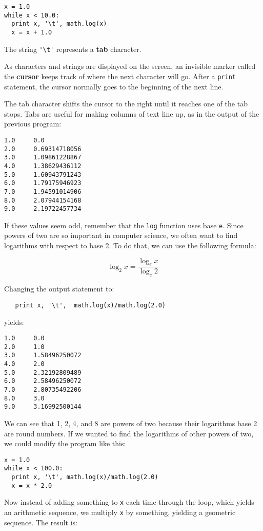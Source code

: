 \beforeverb
\begin{verbatim}
x = 1.0
while x < 10.0:
  print x, '\t', math.log(x)
  x = x + 1.0
\end{verbatim}
\afterverb
%
The string 
\verb+'\t'+ represents a {\bf tab}
character.

As characters and strings are displayed on the screen,
an invisible marker called the {\bf cursor} keeps track of
where the next character will go.  After a {\tt print} statement, the
cursor normally goes to the beginning of the next line.

The tab character shifts the cursor to the right until it
reaches one of the tab stops.  Tabs are useful for making columns of
text line up, as in the output of the previous program:

\beforeverb
\begin{verbatim}
1.0     0.0
2.0     0.69314718056
3.0     1.09861228867
4.0     1.38629436112
5.0     1.60943791243
6.0     1.79175946923
7.0     1.94591014906
8.0     2.07944154168
9.0     2.19722457734
\end{verbatim}
\afterverb
%
If these values seem odd, remember that the {\tt log} function uses
base {\tt e}. Since powers of two are so important in computer
science, we often want to find logarithms with respect to base 2.  To
do that, we can use the following formula:

\begin{displaymath}
\log_2 x = \frac {\log_e x}{\log_e 2}
\end{displaymath}

Changing the output statement to:

\beforeverb
\begin{verbatim}
   print x, '\t',  math.log(x)/math.log(2.0)
\end{verbatim}
\afterverb
%
yields:

\beforeverb
\begin{verbatim}
1.0     0.0
2.0     1.0
3.0     1.58496250072
4.0     2.0
5.0     2.32192809489
6.0     2.58496250072
7.0     2.80735492206
8.0     3.0
9.0     3.16992500144
\end{verbatim}
\afterverb
%
We can see that 1, 2, 4, and 8 are powers of two because their
logarithms base 2 are round numbers.  If we wanted to find the
logarithms of other powers of two, we could modify the program like
this:

\beforeverb
\begin{verbatim}
x = 1.0
while x < 100.0:
  print x, '\t', math.log(x)/math.log(2.0)
  x = x * 2.0
\end{verbatim}
\afterverb
%
Now instead of adding something to {\tt x} each time through the loop, which
yields an arithmetic sequence, we multiply {\tt x} by something, yielding a
geometric sequence.  The result is:

